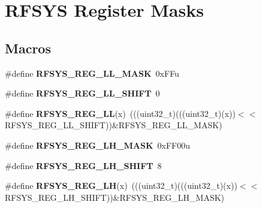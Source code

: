\hypertarget{group__RFSYS__Register__Masks}{}\section{R\+F\+S\+YS Register Masks}
\label{group__RFSYS__Register__Masks}
\subsection*{Macros}
\begin{DoxyCompactItemize}
\item 
\#define {\bfseries R\+F\+S\+Y\+S\+\_\+\+R\+E\+G\+\_\+\+L\+L\+\_\+\+M\+A\+SK}~0x\+F\+Fu\hypertarget{group__RFSYS__Register__Masks_ga2fe64579aaef18ce266e3d6c316d3241}{}\label{group__RFSYS__Register__Masks_ga2fe64579aaef18ce266e3d6c316d3241}

\item 
\#define {\bfseries R\+F\+S\+Y\+S\+\_\+\+R\+E\+G\+\_\+\+L\+L\+\_\+\+S\+H\+I\+FT}~0\hypertarget{group__RFSYS__Register__Masks_gaab45c60c0a8e5edb59537ee2bcb2bbcf}{}\label{group__RFSYS__Register__Masks_gaab45c60c0a8e5edb59537ee2bcb2bbcf}

\item 
\#define {\bfseries R\+F\+S\+Y\+S\+\_\+\+R\+E\+G\+\_\+\+LL}(x)~(((uint32\+\_\+t)(((uint32\+\_\+t)(x))$<$$<$R\+F\+S\+Y\+S\+\_\+\+R\+E\+G\+\_\+\+L\+L\+\_\+\+S\+H\+I\+FT))\&R\+F\+S\+Y\+S\+\_\+\+R\+E\+G\+\_\+\+L\+L\+\_\+\+M\+A\+SK)\hypertarget{group__RFSYS__Register__Masks_gaf197b94e2d03011c483dee604724cfda}{}\label{group__RFSYS__Register__Masks_gaf197b94e2d03011c483dee604724cfda}

\item 
\#define {\bfseries R\+F\+S\+Y\+S\+\_\+\+R\+E\+G\+\_\+\+L\+H\+\_\+\+M\+A\+SK}~0x\+F\+F00u\hypertarget{group__RFSYS__Register__Masks_ga9f8ddcb45324c34fd2d19417b8b13d11}{}\label{group__RFSYS__Register__Masks_ga9f8ddcb45324c34fd2d19417b8b13d11}

\item 
\#define {\bfseries R\+F\+S\+Y\+S\+\_\+\+R\+E\+G\+\_\+\+L\+H\+\_\+\+S\+H\+I\+FT}~8\hypertarget{group__RFSYS__Register__Masks_gabe96c857aab7668805c1fb3ea46693bf}{}\label{group__RFSYS__Register__Masks_gabe96c857aab7668805c1fb3ea46693bf}

\item 
\#define {\bfseries R\+F\+S\+Y\+S\+\_\+\+R\+E\+G\+\_\+\+LH}(x)~(((uint32\+\_\+t)(((uint32\+\_\+t)(x))$<$$<$R\+F\+S\+Y\+S\+\_\+\+R\+E\+G\+\_\+\+L\+H\+\_\+\+S\+H\+I\+FT))\&R\+F\+S\+Y\+S\+\_\+\+R\+E\+G\+\_\+\+L\+H\+\_\+\+M\+A\+SK)\hypertarget{group__RFSYS__Register__Masks_ga9b8cd1814fd5957849b91bfd1bdf6ac6}{}\label{group__RFSYS__Register__Masks_ga9b8cd1814fd5957849b91bfd1bdf6ac6}


\end{DoxyCompactItemize}
